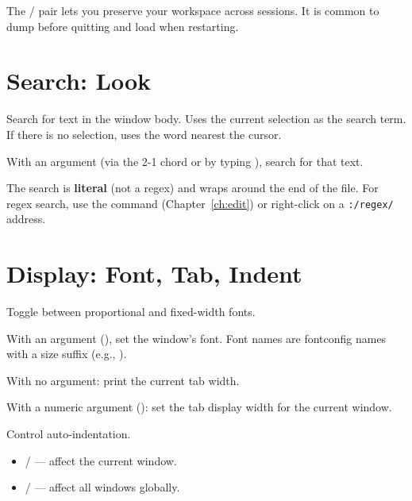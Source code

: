 The / pair lets you preserve your workspace
across sessions.  It is common to dump before quitting and load when
restarting.

\section{Search: Look}
\label{sec:look}


\begin{description}[style=nextline]
\item[\cmd{Look}]
Search for text in the window body.  Uses the current selection as
the search term.  If there is no selection, uses the word nearest
the cursor.

With an argument (via the 2-1 chord or by typing ), search for that text.

The search is \textbf{literal} (not a regex) and wraps around the
end of the file.  For regex search, use the  command
(Chapter~\ref{ch:edit}) or right-click on a \texttt{:/regex/}
address.
\end{description}

\section{Display: Font, Tab, Indent}
\label{sec:display}


\begin{description}[style=nextline]
\item[\cmd{Font}]
Toggle between proportional and fixed-width fonts.

With an argument (), set the window's
font.  Font names are fontconfig names with a size suffix (e.g.,
).

\item[\cmd{Tab}]
With no argument: print the current tab width.

With a numeric argument (): set the tab display width for
the current window.

\item[\cmd{Indent}]
Control auto-indentation.

\begin{itemize}
\item {} /  --- affect the current window.
\item {} /  --- affect all windows globally.
\end{itemize}
\end{description}


